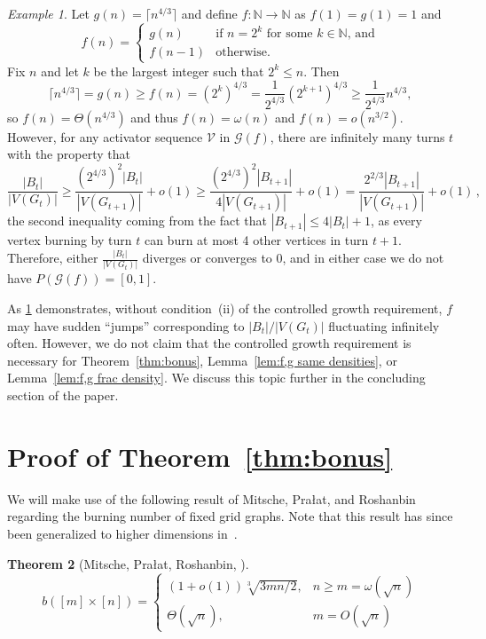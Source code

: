 \documentclass[12pt]{article}
\newtheorem{theorem}{Theorem}[section]
\theoremstyle{remark}
\newtheorem{example}[theorem]{Example}
\providecommand{\N}{}
\renewcommand{\N}{{\mathbb N}}
\newcommand\cG{\mathcal G}
\newcommand\cV{\mathcal V}
\begin{document}
\begin{example}\label{ex:need smoothness}
Let $g(n) = \lceil n^{4/3} \rceil$ and define $f:\N \to \N$ as $f(1) = g(1) =1$ and 
\[
f(n) = 
\begin{cases}
g(n) & \text{if } n = 2^k \text{ for some } k \in \N \text{, and}\\
f(n-1) & \text{otherwise.}
\end{cases}
\]
Fix $n$ and let $k$ be the largest integer such that $2^k \le n$. Then
\[ 
\lceil n^{4/3} \rceil = g(n) \ge f(n) = (2^k)^{4/3} = \frac{1}{2^{4/3}} (2^{k+1})^{4/3} \ge  \frac{1}{2^{4/3}} n^{4/3},
\]
so $f(n) = \Theta\left( n^{4/3} \right)$ and thus $f(n) = \omega(n)$ and $f(n) = o(n^{3/2})$. However, for any activator sequence $\cV$ in $\cG(f)$, there are infinitely many turns $t$ with the property that
\[
\frac{|B_t|}{|V(G_t)|} 
\geq \frac{(2^{4/3})^2 |B_{t}|}{|V(G_{t+1})|} + o(1) 
\geq \frac{(2^{4/3})^2 |B_{t+1}|}{4 |V(G_{t+1})|} + o(1)
= \frac{2^{2/3} |B_{t+1}|}{|V(G_{t+1})|} + o(1)\,,
\]
the second inequality coming from the fact that $|B_{t+1}| \leq 4|B_t|+1$, as every vertex burning by turn $t$ can burn at most 4 other vertices in turn $t+1$. Therefore, either $\frac{|B_t|}{|V(G_t)|}$ diverges or converges to 0, and in either case we do not have $P(\cG(f)) = [0,1]$.
\end{example}

As \cref{ex:need smoothness} demonstrates, without condition~(ii) of the controlled growth requirement, $f$ may have sudden ``jumps'' corresponding to $|B_t|/|V(G_t)|$ fluctuating infinitely often. However, we do not claim that the controlled growth requirement is necessary for Theorem~\ref{thm:bonus}, Lemma~\ref{lem:f,g same densities}, or Lemma~\ref{lem:f,g frac density}. We discuss this topic further in the concluding section of the paper. 

\section{Proof of Theorem~\ref{thm:bonus}}\label{sec:wait and see}

We will make use of the following result of Mitsche, Pra\l{}at, and Roshanbin~\cite{MPR17} regarding the burning number of fixed grid graphs. Note that this result has since been generalized to higher dimensions in~\cite{BC25}.

\begin{theorem}[Mitsche, Pra\l{}at, Roshanbin, \cite{MPR17}] \label{thm:MPR}
\[b([m] \times [n]) = \begin{cases} (1+o(1))\sqrt[3]{3mn/2}, & n \ge m = \omega(\sqrt{n})\\ \Theta(\sqrt{n}), & m = O(\sqrt{n}) \end{cases} \]
\end{theorem}
\end{document}
